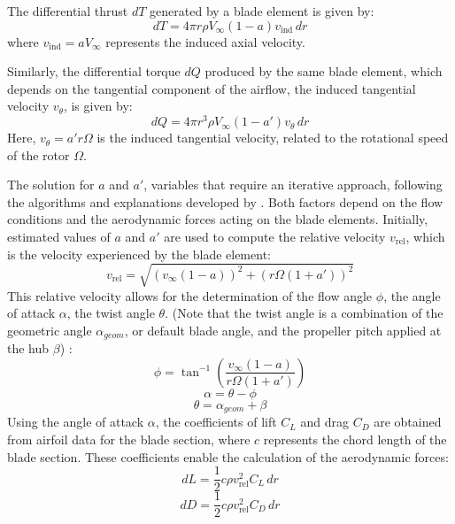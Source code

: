 \documentclass{Format}
\begin{document}
The differential thrust \( dT \) generated by a blade element is given by:
\begin{equation}
dT = 4 \pi r \rho V_{\infty} (1 - a) v_{\text{ind}} \, dr
\end{equation}
where \( v_{\text{ind}} = a V_{\infty} \) represents the induced axial velocity.

Similarly, the differential torque \( dQ \) produced by the same blade element, which depends on the tangential component of the airflow, the induced tangential velocity \( v_{\theta} \), is given by:
\begin{equation}
dQ = 4 \pi r^3 \rho V_{\infty} (1 - a') v_{\theta} \, dr
\end{equation}
Here, \( v_{\theta} = a' r \Omega \) is the induced tangential velocity, related to the rotational speed of the rotor \( \Omega \).

The solution for \(a\) and \(a'\), variables that require an iterative approach, following the algorithms and explanations developed by \cite{ning2021}. Both factors depend on the flow conditions and the aerodynamic forces acting on the blade elements. Initially, estimated values of \(a\) and \(a'\) are used to compute the relative velocity \(v_{\text{rel}}\), which is the velocity experienced by the blade element:
\begin{equation}
v_{\text{rel}} = \sqrt{(v_{\infty} (1 - a))^2 + (r \Omega (1 + a'))^2}
\end{equation}
This relative velocity allows for the determination of the flow angle \(\phi\), the angle of attack \(\alpha\), the twist angle \(\theta\). (Note that the twist angle is a combination of the geometric angle $\alpha_{geom}$, or default blade angle, and the propeller pitch applied at the hub $\beta$) :
\begin{equation}
    \phi = \tan^{-1} \left( \frac{v_{\infty} (1 - a)}{r \Omega (1 + a')} \right)
\end{equation}
\begin{equation}
    \alpha = \theta - \phi
 \end{equation}
 \begin{equation}
    \theta = \alpha_{geom} + \beta
 \end{equation}
Using the angle of attack \(\alpha\), the coefficients of lift \(C_L\) and drag \(C_D\) are obtained from airfoil data for the blade section, where \( c \) represents the chord length of the blade section. These coefficients enable the calculation of the aerodynamic forces:
\begin{equation}
    dL = \frac{1}{2} c \rho v_{\text{rel}}^2 C_L \, dr
\end{equation}
\begin{equation}
    dD = \frac{1}{2} c \rho v_{\text{rel}}^2 C_D \, dr
\end{equation}
\end{document}
